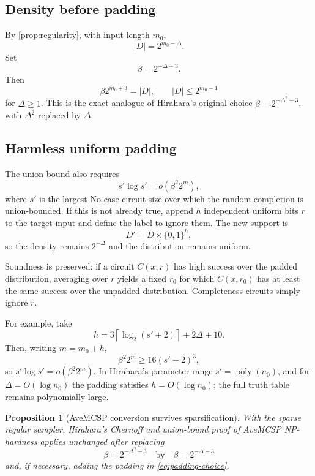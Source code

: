 \documentclass[11pt]{article}
\newtheorem{proposition}[theorem]{Proposition}
\theoremstyle{definition}
\newcommand{\bits}{\{0,1\}}
\newcommand{\poly}{\operatorname{poly}}
\begin{document}
\subsection{Density before padding}

By \cref{prop:regularity}, with input length $m_0$,
\[
 |D|=2^{m_0-\Delta}.
\]
Set
\begin{equation}\label{eq:new-beta}
 \beta=2^{-\Delta-3}.
\end{equation}
Then
\[
 \beta 2^{m_0+3}=|D|,
 \qquad
 |D|\le2^{m_0-1}
\]
for $\Delta\ge1$.  This is the exact analogue of Hirahara's original choice
$\beta=2^{-\Delta^2-3}$, with $\Delta^2$ replaced by $\Delta$.

\subsection{Harmless uniform padding}

The union bound also requires
\[
 s'\log s'=o(\beta^2 2^m),
\]
where $s'$ is the largest No-case circuit size over which the random completion is union-bounded.  If this is not already true, append $h$ independent uniform bits $r$ to the target input and define the label to ignore them.  The new support is
\[
 D'=D\times\bits^h,
\]
so the density remains $2^{-\Delta}$ and the distribution remains uniform.

Soundness is preserved: if a circuit $C(x,r)$ has high success over the padded distribution, averaging over $r$ yields a fixed $r_0$ for which $C(x,r_0)$ has at least the same success over the unpadded distribution.  Completeness circuits simply ignore $r$.

For example, take
\begin{equation}\label{eq:padding-choice}
 h=3\left\lceil\log_2(s'+2)\right\rceil+2\Delta+10.
\end{equation}
Then, writing $m=m_0+h$,
\[
 \beta^2 2^m
 \ge16(s'+2)^3,
\]
so $s'\log s'=o(\beta^2 2^m)$.  In Hirahara's parameter range $s'=\poly(n_0)$, and for $\Delta=O(\log n_0)$ the padding satisfies
$h=O(\log n_0)$; the full truth table remains polynomially large.

\begin{proposition}[AveMCSP conversion survives sparsification]\label{prop:ave}
With the sparse regular sampler, Hirahara's Chernoff and union-bound proof of AveMCSP NP-hardness applies unchanged after replacing
\[
 \beta=2^{-\Delta^2-3}
 \quad\text{by}\quad
 \beta=2^{-\Delta-3}
\]
and, if necessary, adding the padding in \eqref{eq:padding-choice}.
\end{proposition}
\end{document}

